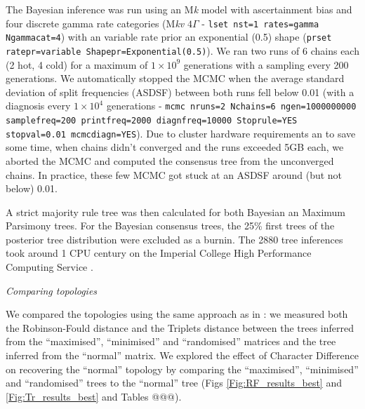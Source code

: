 \documentclass[12pt,letterpaper]{article}
\renewcommand{\subsection}[1]{%
\bigskip
\begin{center}
\begin{large}
\normalfont\itshape #1
\end{large}
\end{center}}
\begin{document}
The Bayesian inference was run using an M\textit{k} model with ascertainment bias and four discrete gamma rate categories (M\textit{kv} $4\Gamma$ - \texttt{lset nst=1 rates=gamma Ngammacat=4}) with an variable rate prior an exponential (0.5) shape (\texttt{prset ratepr=variable Shapepr=Exponential(0.5)}).
We ran two runs of 6 chains each (2 hot, 4 cold) for a maximum of $1\times10^9$ generations with a sampling every 200 generations.
We automatically stopped the MCMC when the average standard deviation of split frequencies (ASDSF) between both runs fell below 0.01 (with a diagnosis every $1\times10^4$ generations - \texttt{mcmc nruns=2 Nchains=6 ngen=1000000000 samplefreq=200 printfreq=2000 diagnfreq=10000 Stoprule=YES stopval=0.01 mcmcdiagn=YES}).
Due to cluster hardware requirements an to save some time, when chains didn't converged and the runs exceeded 5GB each, we aborted the MCMC and computed the consensus tree from the unconverged chains.
In practice, these few MCMC got stuck at an ASDSF around (but not below) 0.01.

A strict majority rule tree was then calculated for both Bayesian an Maximum Parsimony trees.
For the Bayesian consensus trees, the 25\% first trees of the posterior tree distribution were excluded as a burnin.
The 2880 tree inferences took around 1 CPU century on the Imperial College High Performance Computing Service \citep[2-3GHz clock rate;][]{HPC}.

\subsection{Comparing topologies}
We compared the topologies using the same approach as in \cite{Guillerme2016146}: we measured both the Robinson-Fould distance \citep{RF1981} and the Triplets distance \citep{dobson1975triplets} between the trees inferred from the ``maximised'', ``minimised'' and ``randomised'' matrices and the tree inferred from the ``normal'' matrix.
We explored the effect of Character Difference on recovering the ``normal'' topology by comparing the ``maximised'', ``minimised'' and ``randomised'' trees to the ``normal'' tree (Figs \ref{Fig:RF_results_best} and \ref{Fig:Tr_results_best} and Tables @@@).
\end{document}
